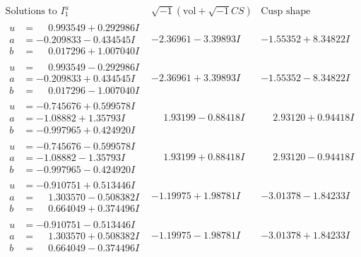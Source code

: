 \documentclass[1p]{elsarticle_modified}
\theoremstyle{definition}
\newcommand{\I}{\sqrt{-1}}
\begin{document}
$$\begin{array}{c|c|c}  
\text{Solutions to }I^u_{1}& \I (\text{vol} + \sqrt{-1}CS) & \text{Cusp shape}\\
 \hline 
\begin{aligned}
u &= \phantom{-}0.993549 + 0.292986 I \\
a &= -0.209833 - 0.434545 I \\
b &= \phantom{-}0.017296 + 1.007040 I\end{aligned}
 & -2.36961 - 3.39893 I & -1.55352 + 8.34822 I \\ \hline\begin{aligned}
u &= \phantom{-}0.993549 - 0.292986 I \\
a &= -0.209833 + 0.434545 I \\
b &= \phantom{-}0.017296 - 1.007040 I\end{aligned}
 & -2.36961 + 3.39893 I & -1.55352 - 8.34822 I \\ \hline\begin{aligned}
u &= -0.745676 + 0.599578 I \\
a &= -1.08882 + 1.35793 I \\
b &= -0.997965 + 0.424920 I\end{aligned}
 & \phantom{-}1.93199 - 0.88418 I & \phantom{-}2.93120 + 0.94418 I \\ \hline\begin{aligned}
u &= -0.745676 - 0.599578 I \\
a &= -1.08882 - 1.35793 I \\
b &= -0.997965 - 0.424920 I\end{aligned}
 & \phantom{-}1.93199 + 0.88418 I & \phantom{-}2.93120 - 0.94418 I \\ \hline\begin{aligned}
u &= -0.910751 + 0.513446 I \\
a &= \phantom{-}1.303570 - 0.508382 I \\
b &= \phantom{-}0.664049 + 0.374496 I\end{aligned}
 & -1.19975 + 1.98781 I & -3.01378 - 1.84233 I \\ \hline\begin{aligned}
u &= -0.910751 - 0.513446 I \\
a &= \phantom{-}1.303570 + 0.508382 I \\
b &= \phantom{-}0.664049 - 0.374496 I\end{aligned}
 & -1.19975 - 1.98781 I & -3.01378 + 1.84233 I \\ \hline\begin{aligned}

\end{aligned}
\end{array}$$
\end{document}
